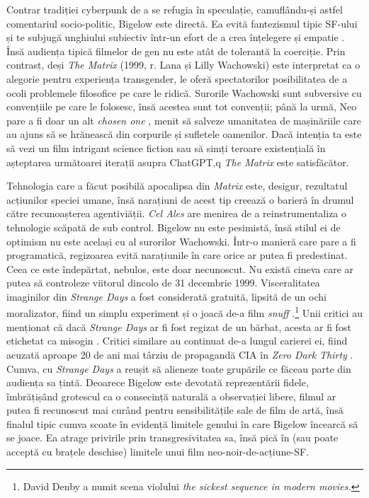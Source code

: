 \documentclass[12pt]{article}
\begin{document}
Contrar \dedouble tradiției\sqtworight\: cyberpunk de a se refugia în speculație, camuflându-și astfel comentariul socio-politic, Bigelow este directă. Ea evită fantezismul tipic SF-ului și te subjugă unghiului subiectiv într-un efort de a crea înțelegere și empatie \cite{Ebert1995a}. Însă audiența tipică filmelor de gen nu este atât de tolerantă la coerciție. Prin contrast, deși \textit{The Matrix} (1999, r. Lana și Lilly Wachowski) este interpretat ca o alegorie pentru experiența transgender, le oferă spectatorilor posibilitatea de a ocoli problemele filosofice pe care le ridică.  Surorile Wachowski sunt subversive cu convențiile pe care le folosesc, însă acestea sunt tot convenții; până la urmă, Neo pare a fi doar un alt \textit{chosen one} \cite{LamanTrulyUnderstand2023}, menit să salveze umanitatea de mașinăriile care au ajuns să se hrănească din corpurile și sufletele oamenilor. Dacă intenția ta este să vezi un film intrigant science fiction sau să simți teroare existențială în așteptarea următoarei iterații asupra ChatGPT,q \textit{The Matrix} este satisfăcător.\par

Tehnologia care a făcut posibilă apocalipsa din \textit{Matrix} este, desigur, rezultatul acțiunilor speciei umane, însă narațiuni de acest tip creează o barieră în drumul către recunoașterea agentiviății. \textit{Cel Ales} are menirea de a reinstrumentaliza o tehnologie scăpată de sub control. Bigelow nu este pesimistă, însă stilul ei de optimism nu este același cu al surorilor Wachowski. Într-o manieră care pare a fi programatică, regizoarea evită narațiunile în care orice ar putea fi predestinat. Ceea ce este îndepărtat, nebulos, este doar necunoscut. Nu există cineva care ar putea să controleze viitorul dincolo de 31 decembrie 1999. Visceralitatea imaginilor din \textit{Strange Days} a fost considerată gratuită, lipsită de un ochi moralizator, fiind un simplu experiment și o joacă de-a film \textit{snuff} \cite{Guthmann1995a, DenbyPeopleStrange1995}.\footnote{David Denby a numit scena violului \textit{\dedouble the sickest sequence in modern movies.\sqtworight}} Unii critici au menționat că dacă \textit{Strange Days} ar fi fost regizat de un bărbat, acesta ar fi fost etichetat ca misogin \cite{MirasolBigelowUncanny2010}. Critici similare au continuat de-a lungul carierei ei, fiind acuzată aproape 20 de ani mai târziu de propagandă CIA în \textit{Zero Dark Thirty} \cite{Vishnevetsky2012a}. Cumva, cu \textit{Strange Days} a reușit să alieneze toate grupările ce făceau parte din audiența sa țintă. Deoarece Bigelow este devotată reprezentării fidele, îmbrățișând grotescul ca o consecință naturală a observației libere, filmul ar putea fi recunoscut mai curând pentru sensibilitățile sale de film de artă, însă finalul tipic cumva scoate în evidență limitele genului în care Bigelow încearcă să se joace. Ea atrage privirile prin transgresivitatea sa, însă pică în (sau poate acceptă cu brațele deschise) limitele unui film neo-noir-de-acțiune-SF.\par
\end{document}
